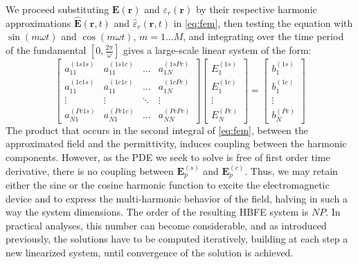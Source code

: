 \documentclass[journal]{IEEEtran}
\renewcommand{\vec}[1]{\mathbf{#1}}
\begin{document}
\par We proceed substituting $\vec{E}(\vec{r})$ and ${\varepsilon}_r(\vec{r})$ by their respective harmonic approximations $\vec{\hat{E}}(\vec{r}, t)$ and $\hat{{\varepsilon}}_r(\vec{r}, t)$ in \eqref{eq:fem}, then testing the equation with $\sin(m \omega t)$ and $\cos(m \omega t)$, $m = 1 \dots M$, and integrating over the time period of the fundamental $\left [ 0,\frac{2\pi}{\omega} \right ]$ gives a large-scale linear system of the form:
\begin{equation}
\scriptscriptstyle
\left[ \begin{array}{cccc}
a_{11}^{(1s1s)} & a_{11}^{(1s1c)} & \ldots &  a_{1N}^{(1sPc)} \\
a_{11}^{(1c1s)} & a_{11}^{(1c1c)} & \ldots &  a_{1N}^{(1cPc)} \\
\vdots & \vdots & \ddots & \vdots \\
a_{N1}^{(Pc1s)} & a_{N1}^{(Pc1c)} & \ldots &  a_{NN}^{(PcPc)}
\end{array}\right] 
\left[ \begin{array}{cccc}
E_{1}^{(1s)} \\
E_{1}^{(1c)} \\
\vdots \\
E_{N}^{(Pc)}
\end{array}\right] =
\left[ \begin{array}{cccc}
b_{1}^{(1s)} \\
b_{1}^{(1c)} \\
\vdots \\
b_{N}^{(Pc)}
\end{array}\right] 
\end{equation}
The product that occurs in the second integral of \eqref{eq:fem}, between the approximated field and the permittivity, induces coupling between the harmonic components. However, as the PDE we seek to solve is free of first order time derivative, there is no coupling between $\vec{E}_{p}^{(s)}$ and $\vec{E}_{p}^{(c)}$. Thus, we may retain either the sine or the cosine harmonic function to excite the electromagnetic device and to express the multi-harmonic behavior of the field, halving in such a way the system dimensions. The order of the resulting HBFE system is $N P$. In practical analyses, this number can become considerable, and as introduced previously, the solutions have to be computed iteratively, building at each step a new linearized system, until convergence of the solution is achieved. 
\end{document}
